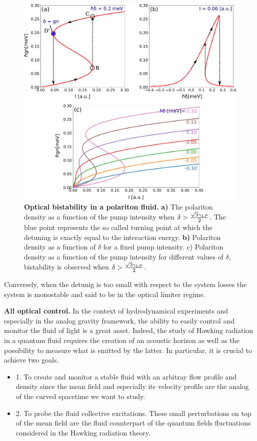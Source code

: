 \begin{figure}
    \centering
    \includegraphics[width=0.8\linewidth]{chap_theory/fig/bistability.pdf}
    \caption{\textbf{Optical bistability in a polariton fluid.} \textbf{a)} The polariton density as a function of the pump intensity when $\delta>\frac{\sqrt{3}\gamma_{LP}}{2}$. The blue point represents the so called turning point at which the detuning is exactly equal to the interaction energy.
    \textbf{b)} Polariton density as a function of $\delta$ for a fixed pump intensity. c) Polariton density as a function of the pump intensity for different values of $\delta$, bistability is observed when $\delta>\frac{\sqrt{3}\gamma_{LP}}{2}$.}
    \label{fig:bistability}
\end{figure}

Conversely, when the detunig is too small with respect to the system losses the system is monostable and said to be in the optical limiter regime.

\bigskip

\textbf{All optical control.} In the context of hydrodynamical experiments and especially in the analog gravity framework, the ability to easily control and monitor the fluid of light is a great asset. Indeed, the study of 
Hawking radiation in a quantum fluid requires the creation of an acoustic horizon as well as the possibility to measure what is emitted by the latter. In particular,
it is crucial to achieve two goals. 

\begin{itemize}
    \item 1. To create and monitor a stable fluid with an arbitray flow profile and density since the mean field and especially its velocity profile are the analog of the curved spacetime we want to study.
    \item 2. To probe the fluid collective excitations. These small perturbations on top of the mean field are the fluid counterpart of the quantum fields fluctuations considered in the Hawking radiation theory.
\end{itemize}

